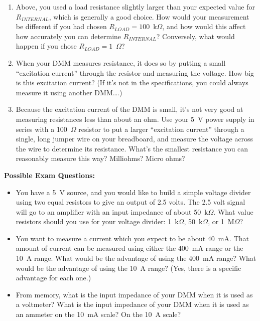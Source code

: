 \begin{enumerate}[wide]
\item Above, you used a load resistance slightly larger than your expected value for $R_{INTERNAL}$, which is generally a good choice.  How would your measurement be different if you had chosen  $R_{LOAD} = 100$~k$\Omega$, and how  would this affect how accurately you can determine $R_{INTERNAL}$?  Conversely, what would happen if you chose $R_{LOAD} = 1$~$\Omega$?  

\item When your DMM measures resistance, it does so by putting a small ``excitation current'' through the resistor and measuring the voltage.  How big is this excitation current?   (If it's not in the specifications, you could always measure it using another DMM….) 

\item Because the excitation current of the DMM is small, it's not very good at measuring resistances less than about an ohm.  Use your 5~V power supply in series with a 100~$\Omega$ resistor to put a larger ``excitation current'' through a single, long jumper wire on your breadboard, and measure the voltage across the wire to determine its resistance.  What's the smallest resistance you can reasonably measure this way?  Milliohms?  Micro ohms?  


\end{enumerate}


\textbf{Possible Exam Questions:}

\begin{itemize}
\item You have a 5~V source, and you would like to build a simple voltage divider using two equal resistors to give an output of 2.5 volts.  The 2.5 volt signal will go to an amplifier with an input impedance of about 50~k$\Omega$.  What value resistors should you use for your voltage divider: 1~k$\Omega$, 50~k$\Omega$, or 1~M$\Omega$?

\item You want to measure a current which you expect to be about 40~mA.  That amount of current can be measured using either the 400~mA range or the 10~A range.  What would be the advantage of using the 400~mA range?  What would be the advantage of using the 10~A range? (Yes, there is a specific advantage for each one.)  

\item From memory, what is the input impedance of your DMM when it is used as a voltmeter?  What is the input impedance of your DMM when it is used as an ammeter on the 10~mA scale?  On the 10~A scale?
\end{itemize}





